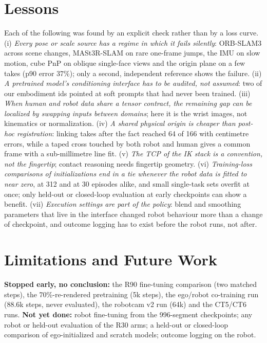 \documentclass[conference,10pt]{IEEEtran}
\begin{document}
\section{Lessons}\label{sec:lessons}
Each of the following was found by an explicit check rather than by a loss curve. (i) \emph{Every pose or scale source has a regime
in which it fails silently}: ORB-SLAM3 across scene changes, MASt3R-SLAM on rare one-frame jumps, the IMU on slow motion, cube PnP on
oblique single-face views and the origin plane on a few takes (p90 error 37\%); only a second, independent reference shows the
failure. (ii) \emph{A pretrained model's conditioning interface has to be audited, not assumed}: two of our embodiment ids pointed at
soft prompts that had never been trained. (iii) \emph{When human and robot data share a tensor contract, the remaining gap can be
localized by swapping inputs between domains}; here it is the wrist images, not kinematics or normalization. (iv) \emph{A shared
physical origin is cheaper than post-hoc registration}: linking takes after the fact reached 64 of 166 with centimetre errors, while
a taped cross touched by both robot and human gives a common frame with a sub-millimetre line fit. (v) \emph{The TCP of the IK stack
is a convention, not the fingertip}; contact reasoning needs fingertip geometry. (vi) \emph{Training-loss comparisons of
initializations end in a tie whenever the robot data is fitted to near zero}, at 312 and at 30 episodes alike, and small single-task
sets overfit at once; only held-out or closed-loop evaluation at early checkpoints can show a benefit. (vii) \emph{Execution settings
are part of the policy}: blend and smoothing parameters that live in the interface changed robot behaviour more than a change of
checkpoint, and outcome logging has to exist before the robot runs, not after.

\section{Limitations and Future Work}\label{sec:lim}
\textbf{Stopped early, no conclusion:} the R90 fine-tuning comparison (two matched steps), the 70\%-re-rendered pretraining (5k
steps), the ego/robot co-training run (88.6k steps, never evaluated), the robotcam v2 run (64k) and the CT5/CT6 runs. \textbf{Not yet
done:} robot fine-tuning from the 996-segment checkpoints; any robot or held-out evaluation of the R30 arms; a held-out or closed-loop
comparison of ego-initialized and scratch models; outcome logging on the robot.
\end{document}
